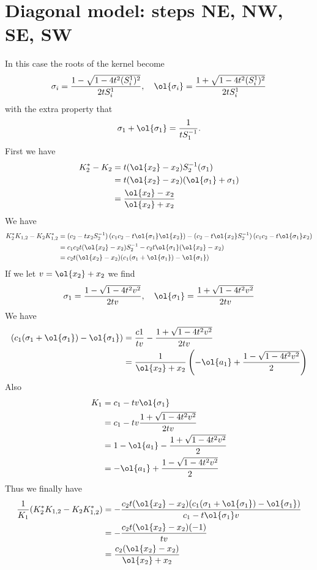 \section{Diagonal model: steps NE, NW, SE, SW}
In this case the roots of the kernel become
\[
    \sigma_i = \frac{1-\sqrt{1-4t^2 (S_i^1)^2}}{2tS_i^1},\quad\ol{\sigma_i} = \frac{1+\sqrt{1-4t^2 (S_i^1)^2}}{2tS_i^1}
\]
with the extra property that
\[
   \sigma_1+\ol{\sigma_1} = \frac{1}{tS_1^{-1}}.
\]
First we have
\begin{align*}
K_2^\ast - K_2 
&= t(\ol{x_2}-x_2)S_2^{-1}(\sigma_1)\\
&=t(\ol{x_2}-x_2)(\ol{\sigma_1}+\sigma_1)\\
&=\frac{\ol{x_2}-x_2}{\ol{x_2}+x_2}
\end{align*}
We have
\begin{align*}
K_2^\ast K_{1,2} - K_2 K_{1,2}^\ast &= (c_2-tx_2S_2^{-1})\left(c_1c_2 - t\ol{\sigma_1}\ol{x_2}\right)-(c_2-t\ol{x_2}S_2^{-1})\left(c_1c_2 - t\ol{\sigma_1}x_2\right)\\
&=c_1c_2t(\ol{x_2}-x_2)S_2^{-1} - c_2t\ol{\sigma_1}(\ol{x_2}-x_2)\\
&=c_2t(\ol{x_2}-x_2)(c_1(\sigma_1+\ol{\sigma_1})-\ol{\sigma_1})
\end{align*}
If we let $v = \ol{x_2}+x_2$ we find
\[
  \sigma_1 = \frac{1-\sqrt{1-4t^2v^2}}{2tv},\quad \ol{\sigma_1} = \frac{1+\sqrt{1-4t^2v^2}}{2tv}
\]
We have
\begin{align*}
(c_1(\sigma_1+\ol{\sigma_1})-\ol{\sigma_1})&= \frac{c1}{tv}-\frac{1+\sqrt{1-4t^2v^2}}{2tv}\\
&=\frac{1}{\ol{x_2}+x_2}\left(-\ol{a_1}+\frac{1-\sqrt{1-4t^2v^2}}{2}\right)
\end{align*}
Also
\begin{align*}
K_1 &= c_1-tv\ol{\sigma_1} \\
&= c_1-tv\frac{1+\sqrt{1-4t^2v^2}}{2tv}\\
&=1-\ol{a_1}-\frac{1+\sqrt{1-4t^2v^2}}{2}\\
&=-\ol{a_1}+\frac{1-\sqrt{1-4t^2v^2}}{2}
\end{align*}
Thus we finally have
\begin{align*}
\frac{1}{K_1}( K_2^\ast K_{1,2}- K_2 K_{1,2}^\ast) 
&= -\frac{c_2t(\ol{x_2}-x_2)(c_1(\sigma_1+\ol{\sigma_1})-\ol{\sigma_1})}{c_1-t\ol{\sigma_1}v}\\
&= -\frac{c_2t(\ol{x_2}-x_2)(-1)}{tv}\\
&= \frac{c_2(\ol{x_2}-x_2)}{\ol{x_2}+x_2}
\end{align*}
